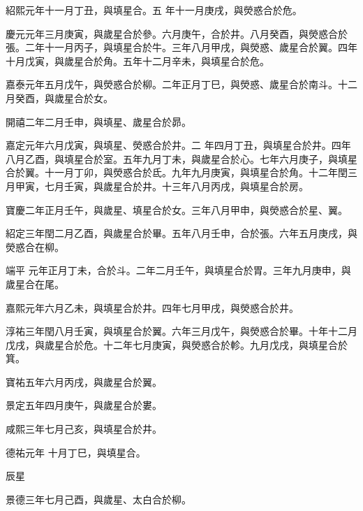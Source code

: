 \begin{pinyinscope}
 紹熙元年十一月丁丑，與填星合。五
 年十一月庚戌，與熒惑合於危。



 慶元元年三月庚寅，與歲星合於參。六月庚午，合於井。八月癸酉，與熒惑合於張。二年十一月丙子，與填星合於牛。三年八月甲戌，與熒惑、歲星合於翼。四年十月戊寅，與歲星合於角。五年十二月辛未，與填星合於危。



 嘉泰元年五月戊午，與熒惑合於柳。二年正月丁巳，與熒惑、歲星合於南斗。十二月癸酉，與歲星合於女。



 開禧二年二月壬申，與填星、歲星合於昴。



 嘉定元年六月戊寅，與填星、熒惑合於井。二
 年四月丁丑，與填星合於井。四年八月乙酉，與填星合於室。五年九月丁未，與歲星合於心。七年六月庚子，與填星合於翼。十一月丁卯，與熒惑合於氐。九年九月庚寅，與填星合於角。十二年閏三月甲寅，七月壬寅，與歲星合於井。十三年八月丙戌，與填星合於房。



 寶慶二年正月壬午，與歲星、填星合於女。三年八月甲申，與熒惑合於星、翼。



 紹定三年閏二月乙酉，與歲星合於畢。五年八月壬申，合於張。六年五月庚戌，與熒惑合在柳。



 端平
 元年正月丁未，合於斗。二年二月壬午，與填星合於胃。三年九月庚申，與歲星合在尾。



 嘉熙元年六月乙未，與填星合於井。四年七月甲戌，與熒惑合於井。



 淳祐三年閏八月壬寅，與填星合於翼。六年三月戊午，與熒惑合於畢。十年十二月戊戌，與歲星合於危。十二年七月庚寅，與熒惑合於軫。九月戊戌，與填星合於箕。



 寶祐五年六月丙戌，與歲星合於翼。



 景定五年四月庚午，與歲星合於婁。



 咸熙三年七月己亥，與填星合於井。



 德祐元年
 十月丁巳，與填星合。



 辰星



 景德三年七月己酉，與歲星、太白合於柳。




\end{pinyinscope}
